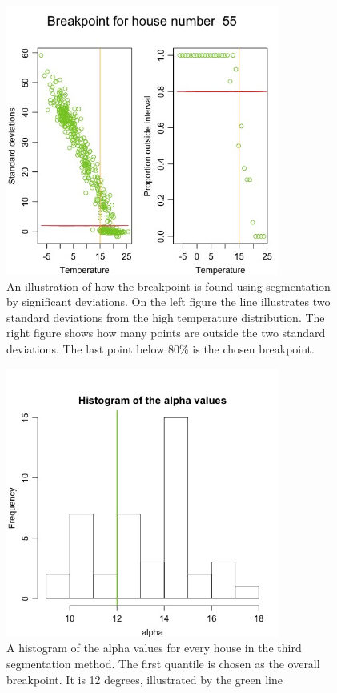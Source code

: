 \begin{figure}
    \centering
    \includegraphics[width=0.8\textwidth]{../../../figures/Breakpoint.jpeg}
    \caption{An illustration of how the breakpoint is found using segmentation by significant deviations. On the left figure the line illustrates two standard deviations from the high temperature distribution.
    The right figure shows how many points are outside the two standard deviations. The last point below 80\% is the chosen breakpoint.}
    \label{fig: Breakpoint}
\end{figure}

\begin{figure}
    \centering
    \includegraphics[width=0.8\textwidth]{../../../figures/AlphaHist.jpeg}
    \caption{A histogram of the alpha values for every house in the third segmentation method. The first quantile is chosen as the overall breakpoint. It is 12 degrees, illustrated by the green line}
    \label{fig: AlphaHist}
\end{figure}

